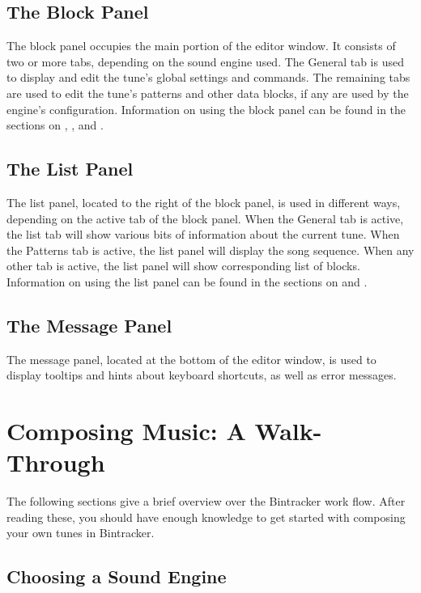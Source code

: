 \documentclass[12pt]{report}	%
\begin{document}
\subsection{The Block Panel}

The block panel occupies the main portion of the editor window. It consists of two or more tabs, depending on the sound engine used. The General tab is used to display and edit the tune's global settings and commands. The remaining tabs are used to edit the tune's patterns and other data blocks, if any are used by the engine's configuration. Information on using the block panel can be found in the sections on , , and .

\subsection{The List Panel}

The list panel, located to the right of the block panel, is used in different ways, depending on the active tab of the block panel. When the General tab is active, the list tab will show various bits of information about the current tune. When the Patterns tab is active, the list panel will display the song sequence. When any other tab is active, the list panel will show corresponding list of blocks. Information on using the list panel can be found in the sections on  and .

\subsection{The Message Panel}


The message panel, located at the bottom of the editor window, is used to display tooltips and hints about keyboard shortcuts, as well as error messages.

\section{Composing Music: A Walk-Through}

The following sections give a brief overview over the Bintracker work flow. After reading these, you should have enough knowledge to get started with composing your own tunes in Bintracker.

\subsection{Choosing a Sound Engine}
\end{document}
